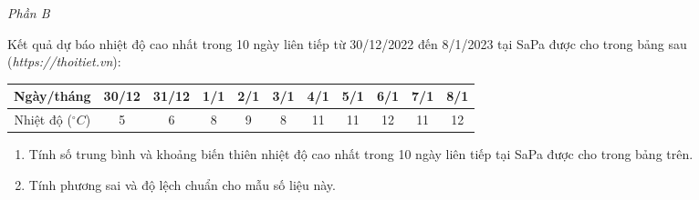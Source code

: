 \begin{center}
	\textit{Phần B}
\end{center}

\begin{bt}%
Kết quả dự báo nhiệt độ cao nhất trong 10 ngày liên tiếp từ 30/12/2022 đến 8/1/2023 tại SaPa được cho trong bảng sau (\textit{https://thoitiet.vn}):
\begin{center}
	\begin{tabular}{|c|c|c|c|c|c|c|c|c|c|c|}
\hline
Ngày/tháng &30/12&31/12&1/1&2/1&3/1&4/1&5/1&6/1&7/1&8/1 \\
\hline
Nhiệt độ ($^\circ C$)& 5 & 6 & 8 & 9 & 8 & 11 & 11 & 12 & 11 & 12 \\
\hline
\end{tabular}
\end{center}
\begin{enumerate}
\item Tính số trung bình và khoảng biến thiên nhiệt độ cao nhất trong 10 ngày liên tiếp tại SaPa được cho trong bảng trên.
\item Tính phương sai và độ lệch chuẩn cho mẫu số liệu này.
\end{enumerate}
\end{bt}
